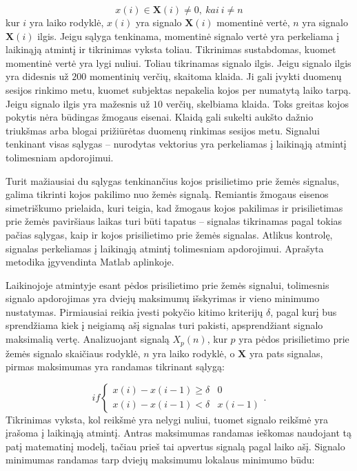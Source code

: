 \documentclass[]{vgtuef}
\begin{document}
\begin{equation}
	x(i) \in \mathbf{X}(i) \neq 0, ~kai~i \neq n
\end{equation}
kur $i$ yra laiko rodyklė, $x(i)$ yra signalo $\mathbf{X}(i)$ momentinė vertė, $n$ yra signalo $\mathbf{X}(i)$ ilgis. Jeigu sąlyga tenkinama, momentinė signalo vertė yra perkeliama į laikinąją atmintį ir tikrinimas vyksta toliau. Tikrinimas sustabdomas, kuomet momentinė vertė yra lygi nuliui. Toliau tikrinamas signalo ilgis. Jeigu signalo ilgis yra didesnis už $200$ momentinių verčių, skaitoma klaida. Ji gali įvykti duomenų sesijos rinkimo metu, kuomet subjektas nepakelia kojos per numatytą laiko tarpą. Jeigu signalo ilgis yra mažesnis už $10$ verčių, skelbiama klaida. Toks greitas kojos pokytis nėra būdingas žmogaus eisenai. Klaidą gali sukelti aukšto dažnio triukšmas arba blogai prižiūrėtas duomenų rinkimas sesijos metu. Signalui tenkinant visas sąlygas -- nurodytas vektorius yra perkeliamas į laikinąją atmintį tolimesniam apdorojimui.

Turit mažiausiai du sąlygas tenkinančius kojos prisilietimo prie žemės signalus, galima tikrinti kojos pakilimo nuo žemės signalą. Remiantis žmogaus eisenos simetriškumo prielaida, kuri teigia, kad žmogaus kojos pakilimas ir prisilietimas prie žemės paviršiaus laikas turi būti tapatus -- signalas tikrinamas pagal tokias pačias sąlygas, kaip ir kojos prisilietimo prie žemės signalas. Atlikus kontrolę, signalas perkeliamas į laikinąją atmintį tolimesniam apdorojimui. Aprašyta metodika įgyvendinta Matlab aplinkoje.


Laikinojoje atmintyje esant pėdos prisilietimo prie žemės signalui, tolimesnis signalo apdorojimas yra dviejų maksimumų išskyrimas ir vieno minimumo nustatymas. Pirmiausiai reikia įvesti pokyčio kitimo kriterijų $\delta$, pagal kurį bus sprendžiama kiek į neigiamą ašį signalas turi pakisti, apsprendžiant signalo maksimalią vertę. Analizuojant signalą $X_p(n)$, kur $p$ yra pėdos prisilietimo prie žemės signalo skaičiaus rodyklė, $n$ yra laiko rodyklė, o $\mathbf{X}$ yra pats signalas, pirmas maksimumas yra randamas tikrinant sąlygą:

\begin{equation}
	if \left\{ \begin{array}{ll}
	x(i) - x(i-1) \geq \delta & 0 \\
	x(i) - x(i-1) < \delta & x(i-1)
	\end{array} \right..
\end{equation}
Tikrinimas vyksta, kol reikšmė yra nelygi nuliui, tuomet signalo reikšmė yra įrašoma į laikinąją atmintį. Antras maksimumas randamas ieškomas naudojant tą patį matematinį modelį, tačiau prieš tai apvertus signalą pagal laiko ašį. Signalo minimumas randamas tarp dviejų maksimumu lokalaus minimumo būdu:
\end{document}
